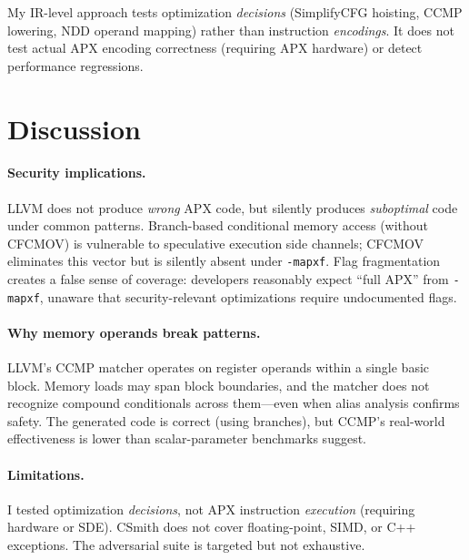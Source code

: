 \documentclass[acmsmall,nonacm]{acmart}
\begin{document}
My IR-level approach tests optimization \emph{decisions} (SimplifyCFG
hoisting, CCMP lowering, NDD operand mapping) rather than instruction
\emph{encodings}. It does not test actual APX encoding correctness
(requiring APX hardware) or detect performance regressions.


\section{Discussion}

\paragraph{Security implications.}
LLVM does not produce \emph{wrong} APX code, but silently produces
\emph{suboptimal} code under common patterns. Branch-based conditional
memory access (without CFCMOV) is vulnerable to speculative execution
side channels; CFCMOV eliminates this vector but is silently absent
under \texttt{-mapxf}. Flag fragmentation creates a false sense of
coverage: developers reasonably expect ``full APX'' from
\texttt{-mapxf}, unaware that security-relevant optimizations require
undocumented flags.

\paragraph{Why memory operands break patterns.}
LLVM's CCMP matcher operates on register operands within a single
basic block. Memory loads may span block boundaries, and the matcher
does not recognize compound conditionals across them---even when alias
analysis confirms safety. The generated code is correct (using
branches), but CCMP's real-world effectiveness is lower than
scalar-parameter benchmarks suggest.

\paragraph{Limitations.}
I tested optimization \emph{decisions}, not APX instruction
\emph{execution} (requiring hardware or SDE). CSmith does not cover
floating-point, SIMD, or C++ exceptions. The adversarial suite is
targeted but not exhaustive.


\end{document}
